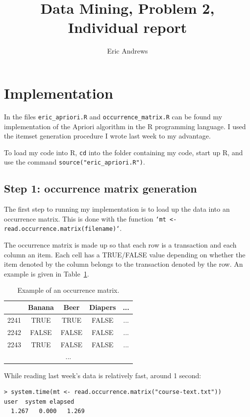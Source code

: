 \documentclass[a4paper,12pt]{article}
\begin{document}
\title{Data Mining, Problem 2, Individual report}
\author{Eric Andrews}

\maketitle

\section{Implementation}
In the files \texttt{eric\_apriori.R} and \texttt{occurrence\_matrix.R} can be
found my implementation of the Apriori algorithm in the R programming language.
I used the itemset generation procedure I wrote last week to my advantage.

To load my code into R, \texttt{cd} into the folder containing my code, start
up R, and use the command \texttt{source("eric\_apriori.R")}. 
\subsection*{Step 1: occurrence matrix generation}
The first step to running my implementation is to load up the data into an
occurrence matrix. This is done with the function
\texttt{`mt <- read.occurrence.matrix(filename)`}.

The occurrence matrix is made up so that each row is a transaction and each
column an item.  Each cell has a TRUE/FALSE value depending on whether the item
denoted by the column belongs to the transaction denoted by the row. An example
is given in Table~\ref{table:eg1}.

\begin{table}
  \centering
  \begin{tabular}{|c|c|c|c|c|}
    \hline
    &     Banana & Beer & Diapers & ... \\
    \hline
    2241 & TRUE & TRUE & FALSE & ... \\
    2242 & FALSE & FALSE & FALSE & ... \\
    2243 & TRUE & FALSE & FALSE & ... \\
    \multicolumn{5}{|c|}{...} \\
    \hline
  \end{tabular}
  \caption{Example of an occurrence matrix.}
  \label{table:eg1}
\end{table}

While reading last week's data is relatively fast, around 1 second:
\begin{verbatim}
> system.time(mt <- read.occurrence.matrix("course-text.txt"))
user  system elapsed
  1.267   0.000   1.269
\end{verbatim}
\end{document}
